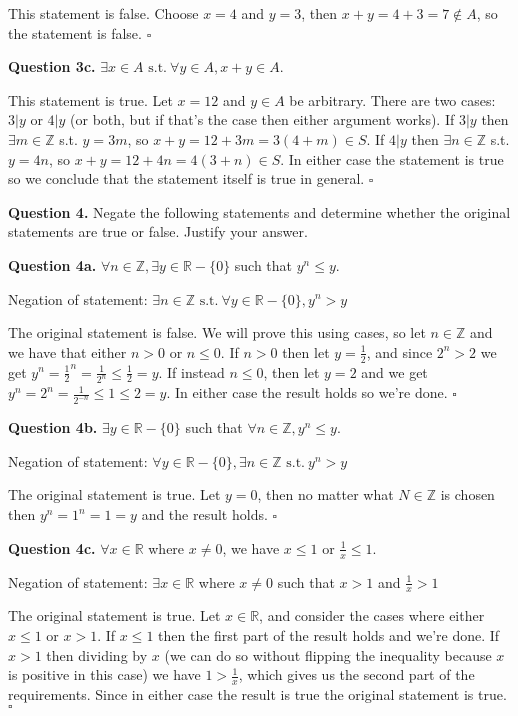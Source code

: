 \documentclass[letterpaper, reqno,11pt]{article}
\newcommand{\RR}{\mathbb{R}}
\newcommand{\ZZ}{\mathbb{Z}}
\newcommand{\st}{\text{ s.t.}\ }
\begin{document}
\medskip

This statement is false. Choose $x=4$ and $y=3$, then $x+y=4+3=7\notin A$, so the statement is false. $\square$

{\noindent\bf Question 3c.} $\exists x\in A\st \forall y\in A, x+y\in A$. 

\medskip

This statement is true. Let $x=12$ and $y\in A$ be arbitrary. There are two cases: $3|y$ or $4|y$ (or both, but if that's the case then either argument works). If $3|y$ then $\exists m\in\ZZ$ s.t. $y=3m$, so $x+y=12+3m=3(4+m)\in S$. If $4|y$ then $\exists n\in\ZZ$ s.t. $y=4n$, so $x+y=12+4n=4(3+n)\in S$. In either case the statement is true so we conclude that the statement itself is true in general. $\square$

{\noindent\bf Question 4.} Negate the following statements and determine whether the original statements are true or false. Justify your answer. 

{\noindent\bf Question 4a.} $\forall n\in\ZZ, \exists y\in\RR-\{0\}$ such that $y^n\leq y$. 

\medskip

Negation of statement: $\exists n\in\ZZ\st\forall y\in\RR-\{0\}, y^n>y$

The original statement is false. We will prove this using cases, so let $n\in\ZZ$ and we have that either $n>0$ or $n\leq0$. If $n>0$ then let $y=\frac12$, and since $2^n>2$ we get $y^n=\frac12^n=\frac1{2^n}\leq\frac1{2}=y$. If instead $n\leq0$, then let $y=2$ and we get $y^n=2^n=\frac1{2^{-n}}\leq 1\leq 2=y$. In either case the result holds so we're done. $\square$

{\noindent\bf Question 4b.} $\exists y\in\RR-\{0\}$ such that $\forall n\in\ZZ, y^n\leq y$. 

\medskip

Negation of statement: $\forall y\in\RR-\{0\}, \exists n\in\ZZ\st y^n>y$

The original statement is true. Let $y=0$, then no matter what $N\in\ZZ$ is chosen then $y^n=1^n=1=y$ and the result holds. $\square$

{\noindent\bf Question 4c.} $\forall x\in\RR$ where $x\neq 0$, we have $x\leq 1$ or $\frac1x\leq1$. 

\medskip

Negation of statement: $\exists x\in\RR$ where $x\neq0$ such that $x>1$ and $\frac1x>1$

The original statement is true. Let $x\in\RR$, and consider the cases where either $x\leq 1$ or $x>1$. If $x\leq 1$ then the first part of the result holds and we're done. If $x>1$ then dividing by $x$ (we can do so without flipping the inequality because $x$ is positive in this case) we have $1>\frac1x$, which gives us the second part of the requirements. Since in either case the result is true the original statement is true. $\square$
\end{document}
